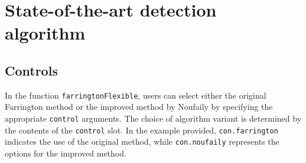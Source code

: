 \documentclass[a4paper,twoside,11pt]{report} %
\theoremstyle{definition}
\theoremstyle{definition}
\theoremstyle{definition}
\theoremstyle{definition}
\theoremstyle{remark}
\begin{document}
\chapter{State-of-the-art detection algorithm}

\section{Controls}\label{controlsStateOfTheArt}

In the function \texttt{farringtonFlexible}, users can select either the original Farrington method or the improved method by Noufaily by specifying the appropriate \texttt{control} arguments. The choice of algorithm variant is determined by the contents of the \texttt{control} slot. In the example provided, \texttt{con.farrington} indicates the use of the original method, while \texttt{con.noufaily} represents the options for the improved method.
\end{document}
